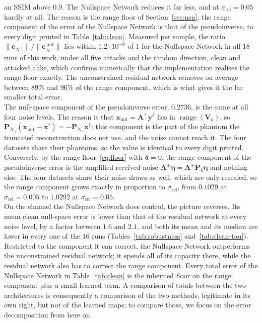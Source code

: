\documentclass{article}
\numberwithin{equation}{section}
\begin{document}
an SSIM above $0.9$. The Nullspace Network reduces it far less, and at $\sigma_{\text{rel}}=0.05$
hardly at all. The reason is the range floor of Section~\ref{sec:nsn}: the range component of the error
of the Nullspace Network is that of the pseudoinverse, to every digit printed in Table~\ref{tab:clean}.
Measured per sample, the ratio
$\lVert\mathbf{e}_{\mathcal{N}^\perp}\rVert/\lVert\mathbf{e}_{\mathcal{N}^\perp}^{\,\text{init}}\rVert$
lies within $1.2\cdot10^{-6}$ of $1$ for the Nullspace Network in all $18$ runs of this work, under
all five attacks and the random direction, clean and attacked alike, which confirms numerically that the
implementation realises the range floor exactly.
The unconstrained residual network removes on average between $89\%$ and $96\%$ of the range component,
which is what gives it the far smaller total error.\\
The null-space component of the pseudoinverse error, $0.2736$, is the same at all four noise levels.
The reason is that $\mathbf{x}_\text{init}=\mathbf{A}^{+}\mathbf{y}^\delta$ lies in $\operatorname{range}(\mathbf{V}_k)$, so
$\mathbf{P}_{\mathcal{N}_\tau}(\mathbf{x}_\text{init}-\mathbf{x}^\dagger)=-\mathbf{P}_{\mathcal{N}_\tau}\mathbf{x}^\dagger$:
this component is the part of the phantom the truncated reconstruction does not use, and the noise cannot
reach it. The four datasets share their phantoms, so the value is identical to every digit printed.
Conversely, by the range floor~\eqref{eq:floor} with $\boldsymbol{\delta}=0$, the range component of the
pseudoinverse error is the amplified received noise $\mathbf{A}^{+}\boldsymbol{\eta}=\mathbf{A}^{+}\mathbf{P}_k\boldsymbol{\eta}$
and nothing else. The four datasets share their noise draws as well, which are only rescaled, so the range
component grows exactly in proportion to $\sigma_\text{rel}$, from $0.1029$ at $\sigma_\text{rel}=0.005$
to $1.0292$ at $\sigma_\text{rel}=0.05$.\\
On the channel the Nullspace Network does control, the picture reverses. Its mean clean null-space
error is lower than that of the residual network at every noise level, by a factor between $1.6$ and
$2.1$, and both its mean and its median are lower in every one of the $16$ runs
(Tables~\ref{tab:robustness} and~\ref{tab:clean-tau}).
Restricted to the component it can correct, the Nullspace Network outperforms the unconstrained residual network;
it spends all of its capacity there, while the residual network also has to correct the range component.
Every total error of the Nullspace Network in Table~\ref{tab:clean}
is the inherited floor on the range component plus a small learned term.
A comparison of totals between the two architectures is consequently a comparison of the two methods,
legitimate in its own right, but not of the learned maps; to compare those, we focus on the error
decomposition from here on.
\end{document}
